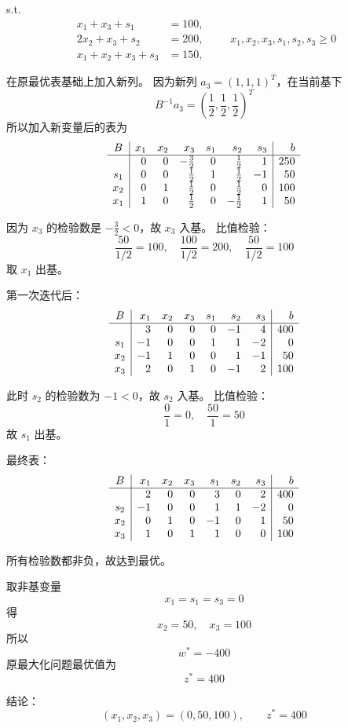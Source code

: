 \documentclass[12pt,a4paper]{article}
\begin{document}
s.t.
\[
\begin{aligned}
x_1+x_3+s_1&=100,\\
2x_2+x_3+s_2&=200,\\
x_1+x_2+x_3+s_3&=150,
\end{aligned}
\qquad x_1,x_2,x_3,s_1,s_2,s_3\ge 0
\]





在原最优表基础上加入新列。
因为新列 $a_3=(1,1,1)^T$，在当前基下
\[
B^{-1}a_3=\left(\frac12,\frac12,\frac12\right)^T
\]
所以加入新变量后的表为
\[
\begin{array}{c|rrrrrr|r}
B & x_1&x_2&x_3&s_1&s_2&s_3&b\\
\hline
  & 0&0&-\frac32&0&\frac12&1&250\\
s_1&0&0&\frac12&1&\frac12&-1&50\\
x_2&0&1&\frac12&0&\frac12&0&100\\
x_1&1&0&\frac12&0&-\frac12&1&50
\end{array}
\]

因为 $x_3$ 的检验数是 $-\frac32<0$，故 $x_3$ 入基。
比值检验：
\[
\frac{50}{1/2}=100,\quad \frac{100}{1/2}=200,\quad \frac{50}{1/2}=100
\]
取 $x_1$ 出基。

第一次迭代后：
\[
\begin{array}{c|rrrrrr|r}
B & x_1&x_2&x_3&s_1&s_2&s_3&b\\
\hline
  & 3&0&0&0&-1&4&400\\
s_1&-1&0&0&1&1&-2&0\\
x_2&-1&1&0&0&1&-1&50\\
x_3&2&0&1&0&-1&2&100
\end{array}
\]

此时 $s_2$ 的检验数为 $-1<0$，故 $s_2$ 入基。
比值检验：
\[
\frac{0}{1}=0,\quad \frac{50}{1}=50
\]
故 $s_1$ 出基。

最终表：
\[
\begin{array}{c|rrrrrr|r}
B & x_1&x_2&x_3&s_1&s_2&s_3&b\\
\hline
  & 2&0&0&3&0&2&400\\
s_2&-1&0&0&1&1&-2&0\\
x_2&0&1&0&-1&0&1&50\\
x_3&1&0&1&1&0&0&100
\end{array}
\]

所有检验数都非负，故达到最优。

取非基变量
\[
x_1=s_1=s_3=0
\]
得
\[
x_2=50,\quad x_3=100
\]
所以
\[
w^*=-400
\]
原最大化问题最优值为
\[
z^*=400
\]

结论：
\[
(x_1,x_2,x_3)=(0,50,100),\qquad z^*=400
\]
\end{document}
